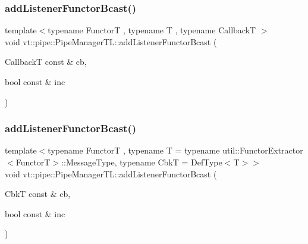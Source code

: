 \subsubsection{\texorpdfstring{add\+Listener\+Functor\+Bcast()}{addListenerFunctorBcast()}\hspace{0.1cm}{\footnotesize\ttfamily [1/2]}}
{\footnotesize\ttfamily template$<$typename FunctorT , typename T , typename CallbackT $>$ \\
void vt\+::pipe\+::\+Pipe\+Manager\+T\+L\+::add\+Listener\+Functor\+Bcast (\begin{DoxyParamCaption}\item[{CallbackT const \&}]{cb,  }\item[{bool const \&}]{inc }\end{DoxyParamCaption})}

\mbox{\label{structvt_1_1pipe_1_1_pipe_manager_t_l_a508e6625e15b9315a24af97670468802}} 
\subsubsection{\texorpdfstring{add\+Listener\+Functor\+Bcast()}{addListenerFunctorBcast()}\hspace{0.1cm}{\footnotesize\ttfamily [2/2]}}
{\footnotesize\ttfamily template$<$typename FunctorT , typename T  = typename util\+::\+Functor\+Extractor$<$\+Functor\+T$>$\+::\+Message\+Type, typename CbkT  = Def\+Type$<$\+T$>$$>$ \\
void vt\+::pipe\+::\+Pipe\+Manager\+T\+L\+::add\+Listener\+Functor\+Bcast (\begin{DoxyParamCaption}\item[{CbkT const \&}]{cb,  }\item[{bool const \&}]{inc }\end{DoxyParamCaption})}

\mbox{\label{structvt_1_1pipe_1_1_pipe_manager_t_l_a12039964ec1deb173f0ee83ad4c8a543}} 
